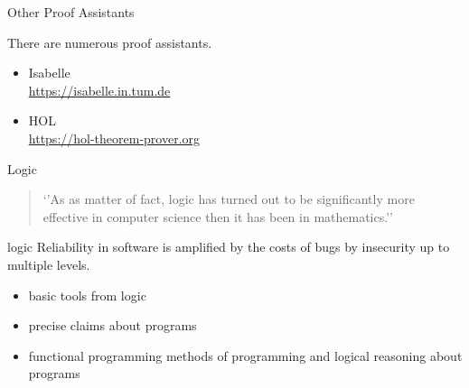 \documentclass{beamer}
\begin{document}
	
	\begin{frame}{Other Proof Assistants}
	
			There are numerous proof assistants.
	
			\begin{itemize}
			\item Isabelle \\
			      \url{https://isabelle.in.tum.de}
			\item HOL \\
			       \url{https://hol-theorem-prover.org}		
			\end{itemize}
		
	\end{frame}
	
	
	\begin{frame}{Logic}
	
		\begin{quote}
		`'As as matter of fact, logic has turned out to be significantly more effective in computer science then it has been in mathematics.''
		\cite{PACGGHSY2019}
		\end{quote}
		
	\end{frame}
	
	
	
	\begin{frame}{logic}
		Reliability in software is amplified by the costs of bugs by insecurity up to multiple levels.


%
		\begin{itemize}
			\item basic tools from logic
			\item precise claims about programs
			\item functional programming methods of programming and logical reasoning about programs
		\end{itemize}
	\end{frame}
	
\end{document}
